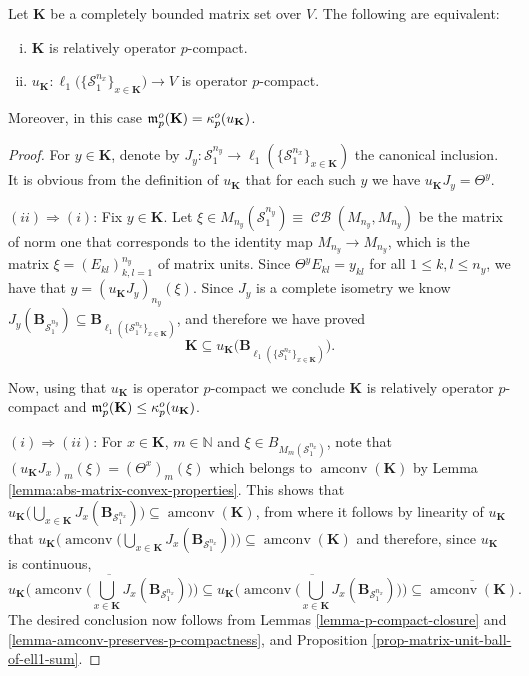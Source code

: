 \documentclass[10pt,a4paper]{amsart}
\DeclareMathOperator{\CB}{\mathcal{CB}}
\DeclareMathOperator{\amconv}{amconv}
\newcommand{\N}{{\mathbb{N}}}
\begin{document}
\begin{theorem}\label{thm:equivalences-p-compact-u}
Let $\mathbf{K}$ be a completely bounded matrix set over $V$.
The following are equivalent:
\begin{enumerate}[(i)]
\item $\mathbf{K}$ is relatively operator $p$-compact.
\item $u_\mathbf{K} : \ell_1\big( \{ \mathcal{S}^{n_x}_1 \}_{x \in \mathbf{K}}\big) \to V$ is operator $p$-compact.
\end{enumerate}
Moreover, in this case $\frak m_p^o(\mathbf{K}) = \kappa_p^o(u_\mathbf{K})$.
\end{theorem}

\begin{proof}
For $y\in \mathbf{K}$, denote by $J_y : \mathcal{S}_1^{n_y} \to \ell_1( \{ \mathcal{S}^{n_x}_1 \}_{x \in \mathbf{K}}) $ the canonical inclusion. It is obvious from the definition of $u_{\mathbf{K}}$ that for each such $y$ we have $u_{\mathbf{K}}J_y = \Theta^y$.

$(ii) \Rightarrow (i)$:
Fix $y\in \mathbf{K}$.
Let $\xi \in M_{n_y}(\mathcal{S}_1^{n_y}) \equiv \CB(M_{n_y},M_{n_y})$ be the matrix of norm one that corresponds to the identity map $M_{n_y} \to M_{n_y}$, which is the matrix $\xi = (E_{kl})_{k,l=1}^{n_y}$ of matrix units.
Since $\Theta^yE_{kl} = y_{kl}$ for all $1 \le k,l \le n_y$, we have that $y = (u_{\mathbf{K}}J_y)_{n_y}(\xi)$.
Since $J_y$ is a complete isometry we know $J_y(\mathbf{B}_{\mathcal{S}_1^{n_y}}) \subseteq \mathbf{B}_{\ell_1( \{ \mathcal{S}^{n_x}_1 \}_{x \in \mathbf{K}}) }$, and therefore we have proved
$$
\mathbf{K} \subseteq u_{\mathbf{K}}\big( \mathbf{B}_{\ell_1( \{ \mathcal{S}^{n_x}_1 \}_{x \in \mathbf{K}}) } \big).
$$

Now, using that $u_{\mathbf{K}}$ is operator $p$-compact we conclude $\mathbf{K}$ is relatively operator $p$-compact and $\frak m_p^o(\mathbf{K}) \le \kappa_p^o(u_\mathbf{K})$.

$(i) \Rightarrow (ii)$:
For $x\in \mathbf{K}$, $m\in\N$ and $\xi \in B_{M_m(\mathcal{S}_1^{n_x})}$, note that $(u_{\mathbf{K}}J_x)_m(\xi) = (\Theta^x)_m(\xi)$
which belongs to $\amconv(\mathbf{K})$ by Lemma \ref{lemma:abs-matrix-convex-properties}.
This shows that $u_{\mathbf{K}} \Big( \bigcup_{x\in \mathbf{K}} J_x(\mathbf{B}_{\mathcal{S}_1^{n_x}}) \Big) \subseteq \amconv(\mathbf{K})$, from where it follows by linearity of $u_{\mathbf{K}}$ that
$u_{\mathbf{K}} \big( \amconv \Big( \bigcup_{x\in \mathbf{K}} J_x(\mathbf{B}_{\mathcal{S}_1^{n_x}}) \Big) \Big)\subseteq \amconv(\mathbf{K})$ and therefore, since $u_\mathbf{K}$ is continuous,
\[
u_{\mathbf{K}} \Big( \overline{\amconv \Big( \bigcup_{x\in \mathbf{K}} J_x(\mathbf{B}_{\mathcal{S}_1^{n_x}})} \Big) \Big) \subseteq
\overline{u_{\mathbf{K}} \Big( \amconv \Big( \bigcup_{x\in \mathbf{K}} J_x(\mathbf{B}_{\mathcal{S}_1^{n_x}}) \Big) \Big)}\subseteq \overline{\amconv(\mathbf{K})}.
\]
The desired conclusion now follows from Lemmas \ref{lemma-p-compact-closure} and 
 \ref{lemma-amconv-preserves-p-compactness},
and Proposition \ref{prop-matrix-unit-ball-of-ell1-sum}.
\end{proof}
\end{document}
